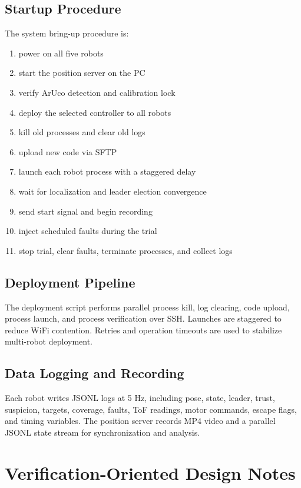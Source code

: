 \documentclass[a4paper,oneside,titlepage,11pt]{report}
\begin{document}
\section{Startup Procedure}
The system bring-up procedure is:
\begin{enumerate}
    \item power on all five robots
    \item start the position server on the PC
    \item verify ArUco detection and calibration lock
    \item deploy the selected controller to all robots
    \item kill old processes and clear old logs
    \item upload new code via SFTP
    \item launch each robot process with a staggered delay
    \item wait for localization and leader election convergence
    \item send start signal and begin recording
    \item inject scheduled faults during the trial
    \item stop trial, clear faults, terminate processes, and collect logs
\end{enumerate}

\section{Deployment Pipeline}
The deployment script performs parallel process kill, log clearing, code upload, process launch, and process verification over SSH. Launches are staggered to reduce WiFi contention. Retries and operation timeouts are used to stabilize multi-robot deployment.

\section{Data Logging and Recording}
Each robot writes JSONL logs at 5 Hz, including pose, state, leader, trust, suspicion, targets, coverage, faults, ToF readings, motor commands, escape flags, and timing variables. The position server records MP4 video and a parallel JSONL state stream for synchronization and analysis.

\chapter{Verification-Oriented Design Notes}
\label{ch:verification}
\end{document}
